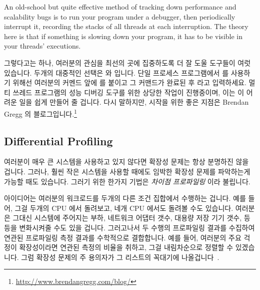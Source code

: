 An old-school but quite effective method of tracking down performance
and scalability bugs is to run your program under a debugger,
then periodically interrupt it, recording the stacks of all threads
at each interruption.
The theory here is that if something is slowing down your program,
it has to be visible in your threads' executions.

\fi

그렇다고는 하나, 여러분의 관심을 최선의 곳에 집중하도록 더 잘 도울 도구들이
여럿 있습니다.
두개의 대중적인 선택은  와  입니다.
단일 프로세스 프로그램에서  를 사용하기 위해선 여러분의 커멘드 앞에
 를 붙이고 그 커맨드가 완료된 후  라고
입력하세요.
멀티 쓰레드 프로그램의 성능 디버깅 도구를 위한 상당한 작업이 진행중이며, 이는
이 어려운 일을 쉽게 만들어 줄 겁니다.
다시 말하지만, 시작을 위한 좋은 지점은 Brendan Gregg 의 블로그입니다.\footnote{
	\url{http://www.brendangregg.com/blog/}}

\subsection{Differential Profiling}
\label{sec:debugging:Differential Profiling}

여러분이 매우 큰 시스템을 사용하고 있지 않다면 확장성 문제는 항상 분명하진 않을
겁니다.
그러나, 훨씬 작은 시스템을 사용할 때에도 임박한 확장성 문제를 파악하는게 가능할
때도 있습니다.
그러기 위한 한가지 기법은 \emph{차이점 프로파일링} 이라 불립니다.

아이디어는 여러분의 워크로드를 두개의 다른 조건 집합에서 수행하는 겁니다.
예를 들어, 그걸 두개의 CPU 에서 돌려보고, 네개 CPU 에서도 돌려볼 수도 있습니다.
여러분은 그대신 시스템에 주어지는 부하, 네트워크 어댑터 갯수, 대용량 저장 기기
갯수, 등등을 변화시켜줄 수도 있을 겁니다.
그러고나서 두 수행의 프로파일링 결과를 수집하여 연관된 프로파일링 측정 결과를
수학적으로 결합합니다.
예를 들어, 여러분의 주요 걱정이 확장성이라면 연관된 측정의 비율을 취하고, 그걸
내림차순으로 정렬할 수 있겠습니다.
그럼 확장성 문제의 주 용의자가 그 리스트의 꼭대기에
나올겁니다~\cite{McKenney95a,McKenney99b}.

